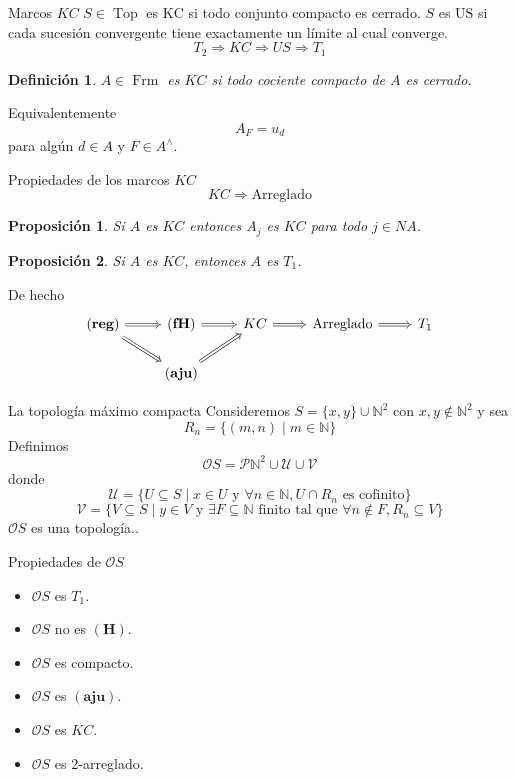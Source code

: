 \documentclass[compress,12pt]{beamer}
\DeclareMathOperator{\Frm}{Frm}
\DeclareMathOperator{\Top}{Top}
\newtheorem{dfn}{Definición}
\newtheorem{prop}{Proposición}
\begin{document}
\begin{frame}{Marcos $KC$}
$S\in \Top$ es $\mathrm{KC}$ si todo conjunto compacto es cerrado. $S$ es $\mathrm{US}$ si cada sucesión convergente tiene exactamente un límite al cual converge.
\[
T_2\Rightarrow KC\Rightarrow US\Rightarrow T_1
\]

\begin{dfn}
$A\in \Frm$ es $KC$ si todo cociente compacto de $A$ es cerrado. 
\end{dfn}
Equivalentemente
\[
A_F=u_d
\]
para algún $d\in A$ y $F\in A^\wedge$.
\end{frame}

\begin{frame}[fragile]{Propiedades de los marcos $KC$}
\[
KC\Rightarrow \mbox{Arreglado}
\]

\begin{prop}
Si $A$ es $KC$ entonces $A_j$ es $KC$ para todo $j\in NA$.
\end{prop}

\begin{prop}
Si $A$ es $KC$, entonces $A$ es $T_1$.
\end{prop}

De hecho
\[\begin{tikzcd}
	{\mathbf{(reg)}} & {\mathbf{(fH)}} & KC & {\mbox{Arreglado}} & {T_1} \\
	& {\mathbf{(aju)}} && {}
	\arrow[Rightarrow, from=1-1, to=1-2]
	\arrow[Rightarrow, from=1-1, to=2-2]
	\arrow[Rightarrow, from=1-2, to=1-3]
	\arrow[Rightarrow, from=1-3, to=1-4]
	\arrow[Rightarrow, from=1-4, to=1-5]
	\arrow[Rightarrow, from=2-2, to=1-3]
\end{tikzcd}\]

\end{frame}

\begin{frame}{La topología máximo compacta}
Consideremos $S=\{x,y\}\cup \mathbb{N}^2$ con $x,y\notin \mathbb{N}^2$ y sea 
\[
R_n=\{(m,n)\mid m\in \mathbb{N}\}
\]
Definimos 
\[
\mathcal{O}S=\mathcal{P}\mathbb{N}^2 \cup \mathcal{U}\cup\mathcal{V}
\]
donde
\[
\mathcal{U}=\{U\subseteq S\mid x\in U\mbox{ y }\forall n\in \mathbb{N}, U\cap R_n\mbox{ es cofinito}\}
\]
\[
\mathcal{V}=\{V\subseteq S\mid y\in V \mbox{ y }\exists F\subseteq \mathbb{N}\mbox{ finito tal que }\forall n\notin F, R_n\subseteq V \}
\]
$\mathcal{O}S$ es una topología..
\end{frame}

\begin{frame}{Propiedades de $\mathcal{O}S$}
	\begin{itemize}
	\item $\mathcal{O}S$ es $T_1$.
	\item $\mathcal{O}S$ no es $\mathbf{(H)}$.
	\item $\mathcal{O}S$ es compacto.
	\item $\mathcal{O}S$ es $\mathbf{(aju)}$.
	\item $\mathcal{O}S$ es $KC$.
	\item $\mathcal{O}S$ es $2$-arreglado.
	\end{itemize}
\end{frame}
\end{document}

